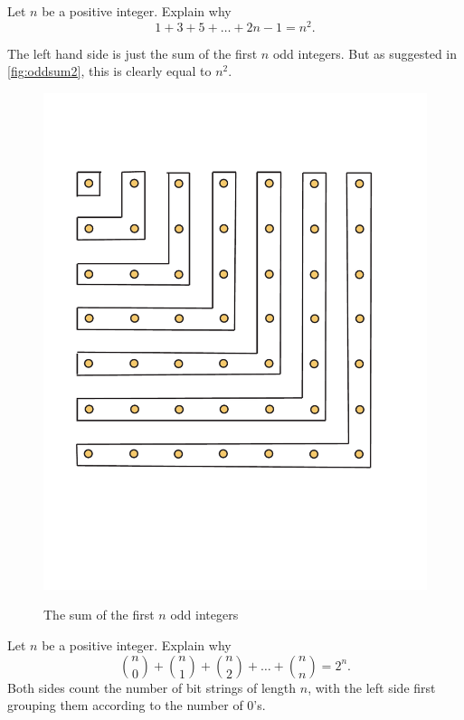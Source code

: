 \begin{example}
Let $n$ be a positive integer. Explain why
\[
1+3+5+\dots+2n-1=n^2.
\]

The left hand side is just the
sum of the first $n$ odd integers.  But as suggested in
\autoref{fig:oddsum2}, this is clearly equal to $n^2$.

\begin{figure}
\begin{center}
\includegraphics[viewport=45 188 534 673,scale=.3]{string-figs/3012-fig21}\\
\caption{The sum of the first $n$ odd integers
\label{fig:oddsum2}}
\end{center}
\end{figure}

\end{example}

\begin{example}
Let $n$ be a positive integer.  Explain why
\[
\binom{n}{0}+\binom{n}{1}+\binom{n}{2}+\dots+\binom{n}{n}=2^n.
\]
Both sides count the number of bit strings of length $n$, with
the left side first grouping them according to the number of
$0$'s.
\end{example}

